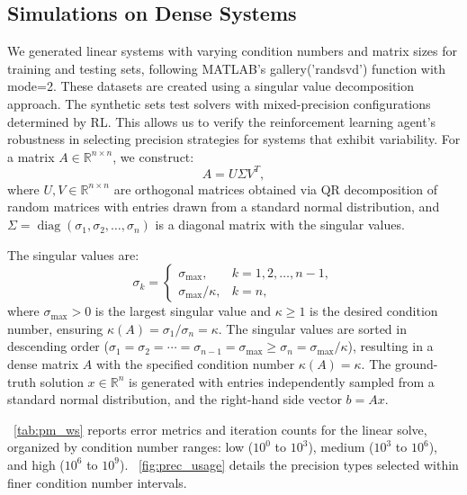 \documentclass[Afour,sageh,times]{sagej}
\theoremstyle{plain}
\theoremstyle{definition}
\begin{document}
\subsection{Simulations on Dense Systems}
We generated linear systems with varying condition numbers and matrix sizes for training and testing sets, following MATLAB's gallery('randsvd') function with mode=2. These datasets are created using a singular value decomposition approach. The synthetic sets test solvers with mixed-precision configurations determined by RL. This allows us to verify the reinforcement learning agent's robustness in selecting precision strategies for systems that exhibit variability. For a matrix $A \in \mathbb{R}^{n \times n}$, we construct:
\begin{equation*}
A = U \Sigma V^T,
\end{equation*}
where $U, V \in \mathbb{R}^{n \times n}$ are orthogonal matrices obtained via QR decomposition of random matrices with entries drawn from a standard normal distribution, and $\Sigma = \operatorname{diag}(\sigma_1, \sigma_2, \ldots, \sigma_n)$ is a diagonal matrix with the singular values.



The singular values are:
\begin{equation}
\sigma_k =
\begin{cases}
\sigma_{\text{max}}, & k = 1, 2, \ldots, n-1, \\
\sigma_{\text{max}} / \kappa, & k = n,
\end{cases}
\end{equation}
where $\sigma_{\text{max}} > 0$ is the largest singular value and $\kappa \geq 1$ is the desired condition number, ensuring $\kappa(A) = \sigma_1 / \sigma_n = \kappa$. The singular values are sorted in descending order ($\sigma_1 = \sigma_2 = \cdots = \sigma_{n-1} = \sigma_{\text{max}} \geq \sigma_n = \sigma_{\text{max}} / \kappa$), resulting in a dense matrix $A$ with the specified condition number $\kappa(A) = \kappa$. The ground-truth solution $x \in \mathbb{R}^n$ is generated with entries independently sampled from a standard normal distribution, and the right-hand side vector $b = A x$.





\tablename~\ref{tab:pm_ws} reports error metrics and iteration counts for the linear solve, organized by condition number ranges: low ($10^0$ to $10^3$), medium ($10^3$ to $10^6$), and high ($10^6$ to $10^9$). \figurename~\ref{fig:prec_usage} details the precision types selected within finer condition number intervals.
\end{document}
